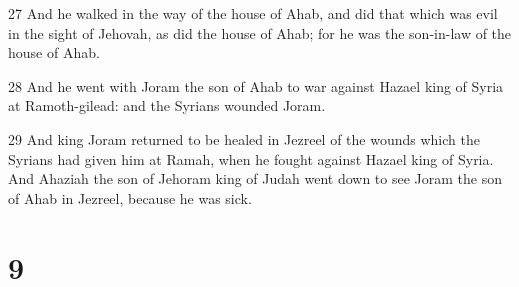 \par 27 And he walked in the way of the house of Ahab, and did that which was evil in the sight of Jehovah, as did the house of Ahab; for he was the son-in-law of the house of Ahab.
\par 28 And he went with Joram the son of Ahab to war against Hazael king of Syria at Ramoth-gilead: and the Syrians wounded Joram.
\par 29 And king Joram returned to be healed in Jezreel of the wounds which the Syrians had given him at Ramah, when he fought against Hazael king of Syria. And Ahaziah the son of Jehoram king of Judah went down to see Joram the son of Ahab in Jezreel, because he was sick.

\chapter{9}

